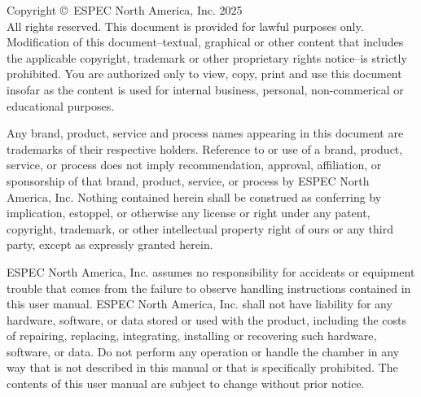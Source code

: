 \noindent Copyright \copyright\ ESPEC North America, Inc. 2025 \\ %

\noindent All rights reserved. This document is provided for lawful purposes only. Modification of this document--textual, graphical or other content that includes the applicable copyright, trademark or other proprietary rights notice--is strictly prohibited. You are authorized only to view, copy, print and use this document insofar as the content is used for internal business, personal, non-commerical or educational purposes. \\


Any brand, product, service and process names appearing in this document are trademarks of their respective holders. Reference to or use of a brand, product, service, or process does not imply recommendation, approval, affiliation, or sponsorship of that brand, product, service, or process by ESPEC North America, Inc. Nothing contained herein shall be construed as conferring by implication, estoppel, or otherwise any 
license or right under any patent, copyright, trademark, or other intellectual property right of ours or any third party, except as expressly granted herein. \\


\noindent ESPEC North America, Inc. assumes no responsibility for accidents or equipment trouble that comes from the failure to observe handling instructions contained in this user manual. ESPEC North America, Inc. shall not have liability for any hardware, software, or data stored or used with the product, including the costs of repairing, replacing, integrating, installing or recovering such hardware, software, or data. Do not perform any operation or handle the chamber in any way that is not described in this manual or that is specifically prohibited. The contents of this user manual are subject to change without prior notice. \\

